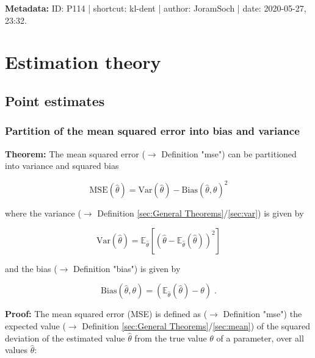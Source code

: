 \documentclass[a4paper,12pt,twoside]{book}
\begin{document}
\vspace{1em}
\textbf{Metadata:} ID: P114 | shortcut: kl-dent | author: JoramSoch | date: 2020-05-27, 23:32.
\vspace{1em}



\pagebreak
\section{Estimation theory}

\subsection{Point estimates}

\subsubsection[\textbf{Partition of the mean squared error into bias and variance}]{Partition of the mean squared error into bias and variance} \label{sec:mse-bnv}
\setcounter{equation}{0}

\textbf{Theorem:} The mean squared error ($\rightarrow$ Definition "mse") can be partitioned into variance and squared bias

\begin{equation} \label{eq:mse-bnv-MSE}
\mathrm{MSE}(\hat{\theta}) = \mathrm{Var}(\hat{\theta}) - \mathrm{Bias}(\hat{\theta},\theta)^2
\end{equation}

where the variance ($\rightarrow$ Definition \ref{sec:General Theorems}/\ref{sec:var}) is given by

\begin{equation} \label{eq:mse-bnv-Var}
\mathrm{Var}(\hat{\theta}) = \mathbb{E}_{\hat{\theta}}\left[ \left( \hat{\theta} - \mathbb{E}_{\hat{\theta}}(\hat{\theta}) \right)^2 \right]
\end{equation}

and the bias ($\rightarrow$ Definition "bias") is given by

\begin{equation} \label{eq:mse-bnv-Bias}
\mathrm{Bias}(\hat{\theta},\theta) = \left( \mathbb{E}_{\hat{\theta}}(\hat{\theta}) - \theta \right) \; .
\end{equation}


\vspace{1em}
\textbf{Proof:} The mean squared error (MSE) is defined as ($\rightarrow$ Definition "mse") the expected value ($\rightarrow$ Definition \ref{sec:General Theorems}/\ref{sec:mean}) of the squared deviation of the estimated value $\hat{\theta}$ from the true value $\theta$ of a parameter, over all values $\hat{\theta}$:
\end{document}
